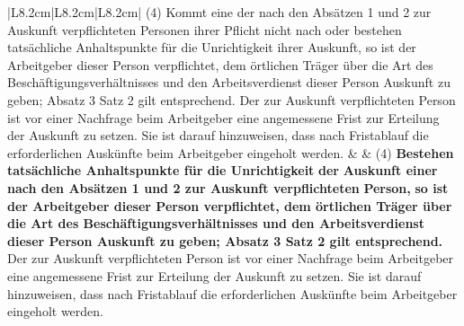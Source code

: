 \documentclass[10pt,a4paper,landscape]{article}
\begin{document}
\begin{longtable}{|L{8.2cm}|L{8.2cm}|L{8.2cm}|}
(4) \textcolor{diffred}{Kommt eine} der nach den Absätzen 1  \newline und 2 zur Auskunft verpflichteten \textcolor{diffred}{Personen  \newline ihrer Pflicht nicht nach oder bestehen  \newline tatsächliche Anhaltspunkte für die  \newline Unrichtigkeit ihrer Auskunft,} so ist der  \newline Arbeitgeber dieser Person verpflichtet, dem  \newline örtlichen Träger über die Art des  \newline Beschäftigungsverhältnisses und den  \newline Arbeitsverdienst dieser Person Auskunft zu  \newline geben; Absatz 3 Satz 2 gilt entsprechend.  \newline Der zur Auskunft verpflichteten Person ist  \newline vor einer Nachfrage beim Arbeitgeber eine  \newline angemessene Frist zur Erteilung der  \newline Auskunft zu setzen. Sie ist darauf  \newline hinzuweisen, dass nach Fristablauf die  \newline erforderlichen Auskünfte beim Arbeitgeber  \newline eingeholt werden. &  & (4) \textbf{\textcolor{diffgreen}{Bestehen tatsächliche Anhaltspunkte  \newline für die Unrichtigkeit}}\textbf{ der }\textbf{\textcolor{diffgreen}{Auskunft einer}}\textbf{  \newline nach den Absätzen 1 und 2 zur Auskunft  \newline verpflichteten }\textbf{\textcolor{diffgreen}{Person,}}\textbf{ so ist der  \newline Arbeitgeber dieser Person verpflichtet,  \newline dem örtlichen Träger über die Art des  \newline Beschäftigungsverhältnisses und den  \newline Arbeitsverdienst dieser Person  \newline Auskunft zu geben; Absatz 3 Satz 2 gilt  \newline entsprechend.} Der zur Auskunft  \newline verpflichteten Person ist vor einer  \newline Nachfrage beim Arbeitgeber eine  \newline angemessene Frist zur Erteilung der  \newline Auskunft zu setzen. Sie ist darauf  \newline hinzuweisen, dass nach Fristablauf die  \newline erforderlichen Auskünfte beim Arbeitgeber  \newline eingeholt werden. \\

\end{longtable}
\end{document}
